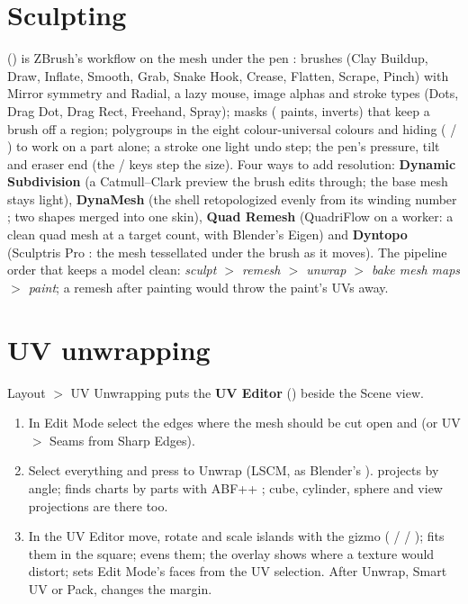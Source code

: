 \section{Sculpting}
 () is ZBrush's workflow on the mesh under the pen \cite{ZBrushDocs2026}:
brushes (Clay Buildup, Draw, Inflate, Smooth, Grab, Snake Hook, Crease, Flatten, Scrape, Pinch) with Mirror symmetry
and Radial, a lazy mouse, image alphas and stroke types (Dots, Drag Dot, Drag Rect, Freehand, Spray); masks (
paints,  inverts) that keep a brush off a region; polygroups in the eight colour-universal colours
\cite{Okabe2008Color} and hiding ( / ) to work on a part alone; a stroke one light undo step; the
pen's pressure, tilt and eraser end (the \key{[} / \key{]} keys step the size). Four ways to add resolution:
\textbf{Dynamic Subdivision} (a Catmull--Clark preview the brush edits through; the base mesh stays light),
\textbf{DynaMesh} (the shell retopologized evenly from its winding number \cite{Jacobson2013Robust,
Gibson1998Constrained}; two shapes merged into one skin), \textbf{Quad Remesh} (QuadriFlow \cite{Huang2018Quadriflow}
on a worker: a clean quad mesh at a target count, with Blender's Eigen) and \textbf{Dyntopo} (Sculptris Pro
\cite{SculptrisDocs2026}: the mesh tessellated under the brush as it moves). The pipeline order that keeps a model
clean: \emph{sculpt $>$ remesh $>$ unwrap $>$ bake mesh maps $>$ paint}; a remesh after painting would throw the paint's
UVs away.

\section{UV unwrapping}
Layout $>$ UV Unwrapping puts the \textbf{UV Editor} () beside the Scene view.
\begin{enumerate}
  \item In Edit Mode select the edges where the mesh should be cut open and  (or UV $>$ Seams from Sharp
    Edges).
  \item Select everything and press  to Unwrap (LSCM, as Blender's \cite{Levy2002Least}).  projects
    by angle;  finds charts by parts with ABF++ \cite{Sheffer2005Abf, Wang2025Partuv}; cube, cylinder,
    sphere and view projections are there too.
  \item In the UV Editor move, rotate and scale islands with the gizmo ( /  / );  fits them in
    the square;  evens them; the  overlay shows where a texture would distort;  sets
    Edit Mode's faces from the UV selection. After Unwrap, Smart UV or Pack,  changes the margin.
\end{enumerate}

